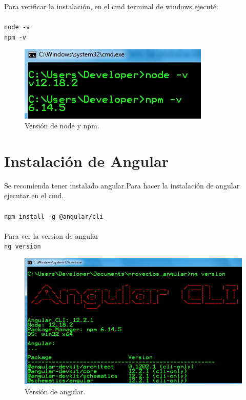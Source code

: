  Para verificar  la instalaci\'on, en el cmd terminal de windows  ejecut\'e:\\\\
\texttt{node -v}\\
\texttt{npm -v}\\
\begin{figure}[H] %
	\centering %
	\includegraphics[scale=0.8]{figuras/fig_1_3.jpg}
	\caption{Versi\'on de node y npm.}
\end{figure}


\section{Instalaci\'on de Angular}
Se recomienda tener instalado angular.Para hacer la instalaci\'on  de  angular ejecutar en el cmd. \\\\
\texttt{npm install -g @angular/cli} \\\\
	Para ver la version de angular\\
\texttt{ng version}
\begin{figure}[H] %
	\centering %
	\includegraphics[scale=0.8]{figuras/fig_1_4.jpg}
	\caption{Versi\'on de angular.}
\end{figure}

